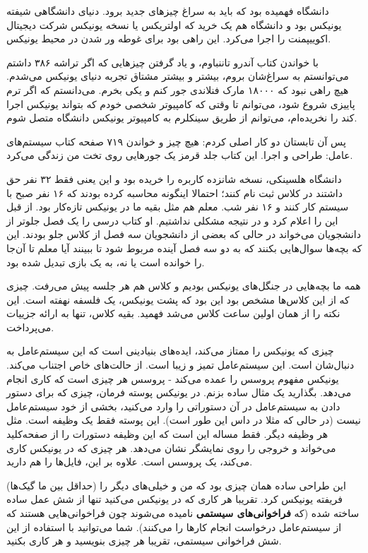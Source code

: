 دانشگاه فهمیده بود که باید به سراغ چیزهای جدید برود. دنیای دانشگاهی
شیفته یونیکس بود و دانشگاه هم یک  خرید که
اولتریکس یا نسخه یونیکس شرکت دیجیتال اکوییپمنت را
اجرا می‌کرد. این راهی بود برای غوطه ور شدن در محیط یونیکس.

با خواندن کتاب آندرو تاننباوم، و یاد گرفتن چیزهایی که اگر تراشه ۳۸۶
داشتم می‌توانستم به سراغ‌شان بروم، بیشتر و بیشتر مشتاق تجربه دنیای
یونیکس می‌شدم. هیچ راهی نبود که ۱۸۰۰۰ مارک فنلاندی جور کنم و یکی
بخرم. می‌دانستم که اگر ترم پاییزی شروع شود، می‌توانم تا وقتی که کامپیوتر
شخصی خودم که بتواند یونیکس اجرا کند را نخریده‌ام، می‌توانم از طریق
سینکلرم به کامپیوتر یونیکس دانشگاه متصل شوم.

پس آن تابستان دو کار اصلی کردم: هیچ چیز و خواندن ۷۱۹ صفحه کتاب
سیستم‌های عامل: طراحی و اجرا. این کتاب جلد قرمز یک جورهایی روی تخت من
زندگی می‌کرد.

دانشگاه هلسینکی، نسخه شانزده کاربره  را خریده بود و این
یعنی فقط ۳۲ نفر حق داشتند در کلاس  ثبت نام کنند؛
احتمالا اینگونه محاسبه کرده بودند که ۱۶ نفر صبح با سیستم کار کنند و ۱۶
نفر شب. معلم هم مثل بقیه ما در یونیکس تازه‌کار بود. از قبل این را اعلام
کرد و در نتیجه مشکلی نداشتیم. او کتاب درسی را یک فصل جلوتر از
دانشجویان می‌خواند در حالی که بعضی از دانشجویان سه فصل از کلاس جلو
بودند. این که بچه‌ها سوال‌هایی بکنند که به دو سه فصل آینده مربوط شود تا
ببینند آیا معلم تا آن‌جا را خوانده است یا نه، به یک بازی تبدیل شده بود.

همه ما بچه‌هایی در جنگل‌های یونیکس بودیم و کلاس هم هر جلسه پیش‌
می‌رفت. چیزی که از این کلاس‌ها مشخص بود این بود که پشت یونیکس، یک فلسفه
نهفته است. این نکته را از همان اولین ساعت کلاس می‌شد فهمید. بقیه کلاس،
تنها به ارائه جزییات می‌پرداخت.

چیزی که یونیکس را ممتاز می‌کند، ایده‌های بنیادینی است که این سیستم‌عامل
به دنبال‌شان است. این سیستم‌عامل تمیز و زیبا است. از حالت‌های خاص اجتناب
می‌کند. یونیکس مفهوم پروسس را عمده می‌کند - پروسس هر چیزی است که کاری
انجام می‌دهد. بگذارید یک مثال ساده بزنم. در یونیکس پوسته فرمان، چیزی که
برای دستور دادن به سیستم‌عامل در آن دستوراتی را وارد می‌کنید، بخشی از
خود سیستم‌عامل نیست (در حالی که مثلا در داس این طور است). این پوسته فقط یک وظیفه
است. مثل هر وظیفه دیگر. فقط مساله این است که این وظیفه دستورات را از
صفحه‌کلید می‌خواند و خروجی را روی نمایشگر نشان می‌دهد. هر چیزی که در
یونیکس کاری می‌کند، یک پروسس است. علاوه بر این، فایل‌ها را هم دارید.

این طراحی ساده همان چیزی بود که من و خیلی‌های دیگر را (حداقل بین ما
گیک‌ها) فریفته یونیکس کرد. تقریبا هر کاری که در یونیکس می‌کنید تنها از
شش عمل ساده ساخته شده (که \textbf{فراخوانی‌های سیستمی} نامیده می‌شوند چون فراخوانی‌هایی هستند که از سیستم‌عامل درخواست
انجام کارها را می‌کنند). شما می‌توانید با استفاده از این شش فراخوانی
سیستمی، تقریبا هر چیزی بنویسید و هر کاری بکنید.

